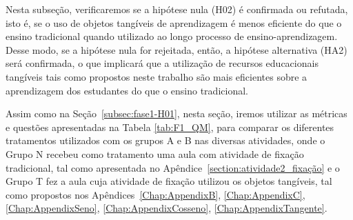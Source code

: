 Nesta subseção, verificaremos se a hipótese nula (H02) é confirmada ou refutada, isto é, se o uso de objetos tangíveis de aprendizagem é menos eficiente do que o ensino tradicional quando utilizado ao longo processo de ensino-aprendizagem. Desse modo, se a hipótese nula for rejeitada, então, a hipótese alternativa (HA2) será confirmada, o que implicará que a utilização de recursos educacionais tangíveis tais como propostos neste trabalho são mais eficientes sobre a aprendizagem dos estudantes do que o ensino tradicional. 



Assim como na Seção~\ref{subsec:fase1-H01}, nesta seção, iremos utilizar as métricas e questões apresentadas na Tabela \ref{tab:F1_QM}, para comparar os diferentes tratamentos utilizados com os grupos A e B nas diversas atividades, onde o Grupo N recebeu como tratamento uma aula com atividade de fixação tradicional, tal como apresentada no Apêndice~\ref{section:atividade2_fixação} e o  Grupo T fez a aula cuja atividade de fixação utilizou os objetos tangíveis, tal como propostos nos Apêndices~\ref{Chap:AppendixB}, \ref{Chap:AppendixC}, \ref{Chap:AppendixSeno}, \ref{Chap:AppendixCosseno}, \ref{Chap:AppendixTangente}.


